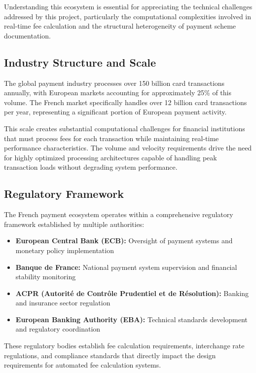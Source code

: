Understanding this ecosystem is essential for appreciating the technical challenges addressed by this project, particularly the computational complexities involved in real-time fee calculation and the structural heterogeneity of payment scheme documentation.

\subsection{Industry Structure and Scale}

The global payment industry processes over 150 billion card transactions annually, with European markets accounting for approximately 25\% of this volume. The French market specifically handles over 12 billion card transactions per year, representing a significant portion of European payment activity.

This scale creates substantial computational challenges for financial institutions that must process fees for each transaction while maintaining real-time performance characteristics. The volume and velocity requirements drive the need for highly optimized processing architectures capable of handling peak transaction loads without degrading system performance.

\subsection{Regulatory Framework}

The French payment ecosystem operates within a comprehensive regulatory framework established by multiple authorities:

\begin{itemize}
    \item \textbf{European Central Bank (ECB):} Oversight of payment systems and monetary policy implementation
    \item \textbf{Banque de France:} National payment system supervision and financial stability monitoring
    \item \textbf{ACPR (Autorité de Contrôle Prudentiel et de Résolution):} Banking and insurance sector regulation
    \item \textbf{European Banking Authority (EBA):} Technical standards development and regulatory coordination
\end{itemize}

These regulatory bodies establish fee calculation requirements, interchange rate regulations, and compliance standards that directly impact the design requirements for automated fee calculation systems.

